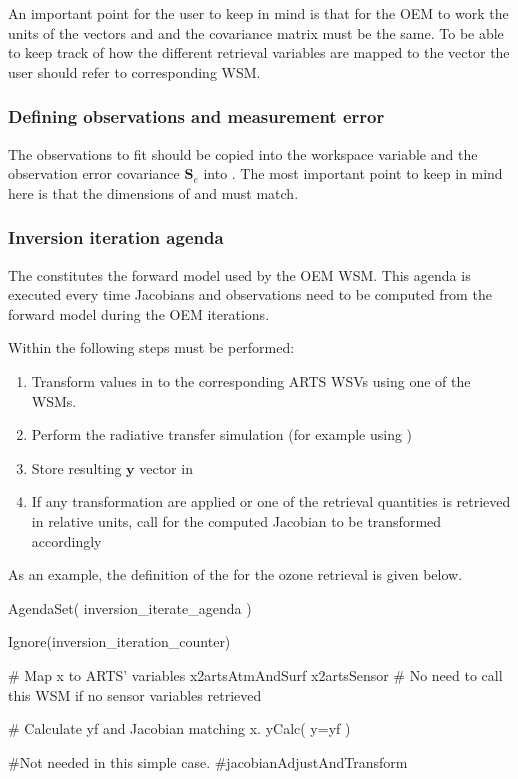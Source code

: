 An important point for the user to keep in mind is that for the OEM to
work the units of the vectors  and  and
 the covariance matrix  must be the same. To be
able to keep track of how the different retrieval variables are mapped
to the  vector the user should refer to corresponding
 WSM.

\subsubsection{Defining observations and measurement error}

The observations to fit should be copied into the  workspace
variable and the observation error covariance $\mathbf{S}_e$ into .
The most important point to keep in mind here is that the dimensions of
  and  must match.

\subsubsection{Inversion iteration agenda}

The  constitutes the forward model used by
the OEM WSM. This agenda is executed every time Jacobians and observations need
to be computed from the forward model during the OEM iterations.

Within   the following steps must be
performed:

\begin{enumerate}
\item Transform values in  to the corresponding
ARTS WSVs using one of the  WSMs.
\item Perform the radiative transfer simulation (for example using
)
\item  Store resulting $\mathbf{y}$ vector in 
\item If any transformation are applied or one of the retrieval quantities
is retrieved in relative units, call
  for the computed Jacobian
to be transformed accordingly
\end{enumerate}

As an example, the definition of the 
for the ozone retrieval is given below.

\begin{code}
AgendaSet( inversion_iterate_agenda ){

  Ignore(inversion_iteration_counter)
    
  # Map x to ARTS' variables
  x2artsAtmAndSurf
  x2artsSensor   # No need to call this WSM if no sensor variables retrieved

  # Calculate yf and Jacobian matching x.
  yCalc( y=yf )

  #Not needed in this simple case.
  #jacobianAdjustAndTransform
}
\end{code}


